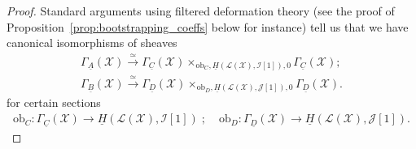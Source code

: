 \documentclass[10pt]{amsart}
\begin{document}
\begin{proof}
Standard arguments using filtered deformation theory (see the proof of Proposition~\ref{prop:bootstrapping_coeffs} below for instance) tell us that we have canonical isomorphisms of sheaves
\begin{align}\label{eqn:GammaB_GammaD_Gamma_A_Gamma_C}
\Gamma_{\underline{A}}(\mathcal{X}) \xrightarrow{\simeq}\Gamma_{\underline{C}}(\mathcal{X})\times_{\mathrm{ob}_C,\underline{H}(\mathcal{L}(\mathcal{X}),\mathcal{I}[1]),0}\Gamma_{\underline{C}}(\mathcal{X});\\
\Gamma_{\underline{B}}(\mathcal{X}) \xrightarrow{\simeq}\Gamma_{\underline{D}}(\mathcal{X})\times_{\mathrm{ob}_D,\underline{H}(\mathcal{L}(\mathcal{X}),\mathcal{J}[1]),0}\Gamma_{\underline{D}}(\mathcal{X}).\nonumber
\end{align}
for certain sections
\begin{align*}
\mathrm{ob}_C:\Gamma_{\underline{C}}(\mathcal{X})\to \underline{H}(\mathcal{L}(\mathcal{X}),\mathcal{I}[1])\;;&\;
\mathrm{ob}_D:\Gamma_{\underline{D}}(\mathcal{X})\to \underline{H}(\mathcal{L}(\mathcal{X}),\mathcal{J}[1]).
\end{align*}


\end{proof}
\end{document}
